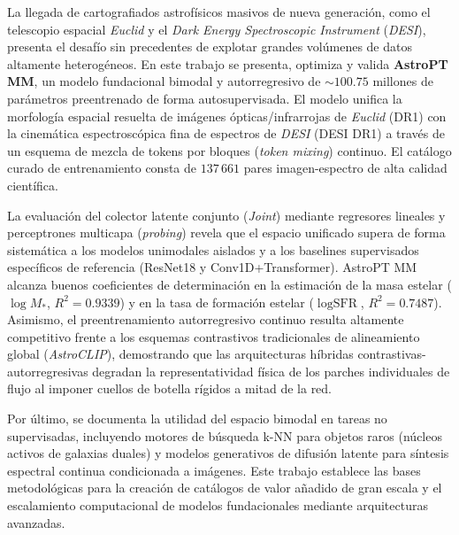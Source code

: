 La llegada de cartografiados astrofísicos masivos de nueva generación, como el telescopio espacial \textit{Euclid} y el \textit{Dark Energy Spectroscopic Instrument} (\textit{DESI}), presenta el desafío sin precedentes de explotar grandes volúmenes de datos altamente heterogéneos. En este trabajo se presenta, optimiza y valida \textbf{AstroPT MM}, un modelo fundacional bimodal y autorregresivo de $\sim 100.75$ millones de parámetros preentrenado de forma autosupervisada. El modelo unifica la morfología espacial resuelta de imágenes ópticas/infrarrojas de \textit{Euclid} (DR1) con la cinemática espectroscópica fina de espectros de \textit{DESI} (DESI DR1) a través de un esquema de mezcla de tokens por bloques (\textit{token mixing}) continuo. El catálogo curado de entrenamiento consta de $137\,661$ pares imagen-espectro de alta calidad científica.

La evaluación del colector latente conjunto (\textit{Joint}) mediante regresores lineales y perceptrones multicapa (\textit{probing}) revela que el espacio unificado supera de forma sistemática a los modelos unimodales aislados y a los baselines supervisados específicos de referencia (ResNet18 y Conv1D+Transformer). AstroPT MM alcanza buenos coeficientes de determinación en la estimación de la masa estelar ($\log M_*$, $R^2 = 0.9339$) y en la tasa de formación estelar ($\log\text{SFR}$, $R^2 = 0.7487$). Asimismo, el preentrenamiento autorregresivo continuo resulta altamente competitivo frente a los esquemas contrastivos tradicionales de alineamiento global (\textit{AstroCLIP}), demostrando que las arquitecturas híbridas contrastivas-autorregresivas degradan la representatividad física de los parches individuales de flujo al imponer cuellos de botella rígidos a mitad de la red. 

Por último, se documenta la utilidad del espacio bimodal en tareas no supervisadas, incluyendo motores de búsqueda k-NN para objetos raros (núcleos activos de galaxias duales) y modelos generativos de difusión latente para síntesis espectral continua condicionada a imágenes. Este trabajo establece las bases metodológicas para la creación de catálogos de valor añadido de gran escala y el escalamiento computacional de modelos fundacionales mediante arquitecturas avanzadas.